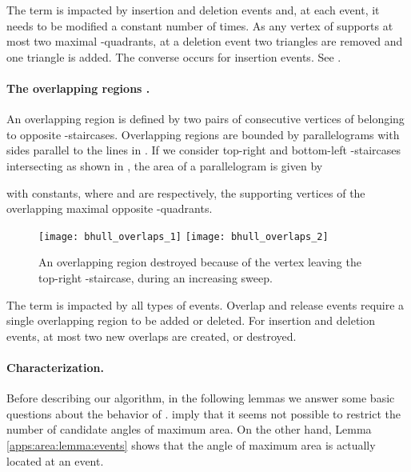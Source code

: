 \documentclass[11pt,letterpaper,english]{article}
\theoremstyle{definition}
\begin{document}
The term  is impacted by insertion and
deletion events and, at each event, it needs to be modified a constant
number of times. As any vertex of  supports at most two
maximal -quadrants, at a deletion event two triangles are
removed and one triangle is added. The converse occurs for insertion
events. See .

\paragraph{The overlapping regions .}

An overlapping region is defined by two pairs of consecutive vertices
of  belonging to opposite -staircases. Overlapping
regions are bounded by parallelograms with sides parallel to the lines
in . If we consider top-right and bottom-left
-staircases intersecting as shown in
, the area of a parallelogram is
given by

with  constants, where  and
 are respectively, the
supporting vertices of the overlapping maximal opposite
-quadrants.

\begin{figure}[ht]
  \centering
  \subcaptionbox{\label{apps:area:fig:parallelogram:1}}
  {\texttt{[image: bhull\_overlaps\_1]}}
  \hspace{1.5cm}
  \subcaptionbox{\label{apps:area:fig:parallelogram:2}}
  {\texttt{[image: bhull\_overlaps\_2]}}
  \caption{An overlapping region destroyed because of the vertex
     leaving the top-right -staircase, during an
    increasing sweep.}
  \label{apps:area:fig:parallelogram}
\end{figure}

The term  is impacted by all types of
events. Overlap and release events require a single overlapping
region to be added or deleted. For insertion and deletion events, at
most two new overlaps are created, or destroyed.

\paragraph{Characterization.}

Before describing our algorithm, in the following lemmas we answer
some basic questions about the behavior of
. 
imply that it seems not possible to restrict the number of
candidate angles of maximum area. On the other hand, Lemma
\ref{apps:area:lemma:events} shows that the angle of maximum area is
actually located at an event.
\end{document}
